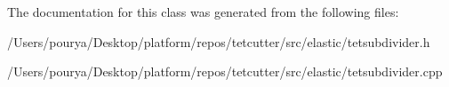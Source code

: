 The documentation for this class was generated from the following files\+:\begin{DoxyCompactItemize}
\item 
/\+Users/pourya/\+Desktop/platform/repos/tetcutter/src/elastic/tetsubdivider.\+h\item 
/\+Users/pourya/\+Desktop/platform/repos/tetcutter/src/elastic/tetsubdivider.\+cpp\end{DoxyCompactItemize}
